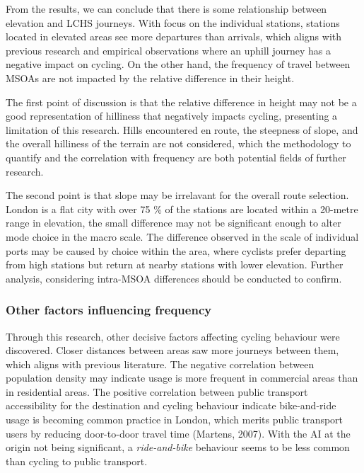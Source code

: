 \documentclass[
  a4paper,
  DIV=11,
  numbers=noendperiod]{scrartcl}
\begin{document}
From the results, we can conclude that there is some relationship
between elevation and LCHS journeys. With focus on the individual
stations, stations located in elevated areas see more departures than
arrivals, which aligns with previous research and empirical observations
where an uphill journey has a negative impact on cycling. On the other
hand, the frequency of travel between MSOAs are not impacted by the
relative difference in their height.

The first point of discussion is that the relative difference in height
may not be a good representation of hilliness that negatively impacts
cycling, presenting a limitation of this research. Hills encountered en
route, the steepness of slope, and the overall hilliness of the terrain
are not considered, which the methodology to quantify and the
correlation with frequency are both potential fields of further
research.

The second point is that slope may be irrelavant for the overall route
selection. London is a flat city with over 75 \% of the stations are
located within a 20-metre range in elevation, the small difference may
not be significant enough to alter mode choice in the macro scale. The
difference observed in the scale of individual ports may be caused by
choice within the area, where cyclists prefer departing from high
stations but return at nearby stations with lower elevation. Further
analysis, considering intra-MSOA differences should be conducted to
confirm.

\hypertarget{other-factors-influencing-frequency}{%
\subsubsection{Other factors influencing
frequency}\label{other-factors-influencing-frequency}}

Through this research, other decisive factors affecting cycling
behaviour were discovered. Closer distances between areas saw more
journeys between them, which aligns with previous literature. The
negative correlation between population density may indicate usage is
more frequent in commercial areas than in residential areas. The
positive correlation between public transport accessibility for the
destination and cycling behaviour indicate bike-and-ride usage is
becoming common practice in London, which merits public transport users
by reducing door-to-door travel time (Martens, 2007). With the AI at the
origin not being significant, a \emph{ride-and-bike} behaviour seems to
be less common than cycling to public transport.
\end{document}
